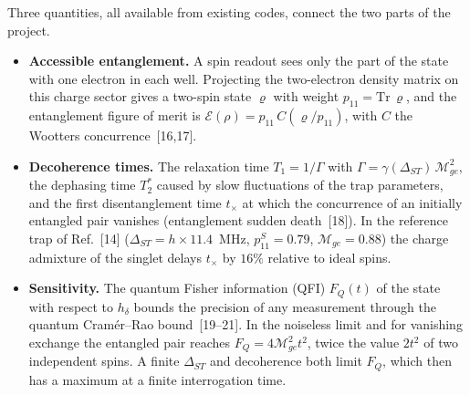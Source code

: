 \documentclass[12pt,a4paper]{article}
\begin{document}
Three quantities, all available from existing codes, connect the two
parts of the project.
\begin{itemize}
  \item \textbf{Accessible entanglement.}  A spin readout sees only
  the part of the state with one electron in each well.  Projecting
  the two-electron density matrix on this charge sector gives a
  two-spin state $\varrho$ with weight $p_{11}=\mathrm{Tr}\,\varrho$,
  and the entanglement figure of merit is
  $\mathcal E(\rho)=p_{11}\,C(\varrho/p_{11})$, with $C$ the
  Wootters concurrence~[16,17].
  \item \textbf{Decoherence times.}  The relaxation time
  $T_1=1/\Gamma$ with
  $\Gamma=\gamma(\Delta_{ST})\,\mathcal M_{ge}^2$, the dephasing time
  $T_2^*$ caused by slow fluctuations of the trap parameters, and the
  first disentanglement time $t_\times$ at which the concurrence of an
  initially entangled pair vanishes (entanglement sudden
  death~[18]).  In the reference trap of Ref.~[14]
  ($\Delta_{ST}=h\times 11.4$~MHz, $p_{11}^S=0.79$,
  $\mathcal M_{ge}=0.88$) the charge admixture of the singlet delays
  $t_\times$ by $16\%$ relative to ideal spins.
  \item \textbf{Sensitivity.}  The quantum Fisher information (QFI)
  $F_Q(t)$ of the state with respect to $h_\delta$ bounds the
  precision of any measurement through the quantum Cram\'er--Rao
  bound~[19--21].  In the noiseless limit and for vanishing exchange
  the entangled pair reaches $F_Q=4\mathcal M_{ge}^2t^2$, twice the
  value $2t^2$ of two independent spins.  A finite $\Delta_{ST}$ and
  decoherence both limit $F_Q$, which then has a maximum at a finite
  interrogation time.
\end{itemize}
\end{document}
